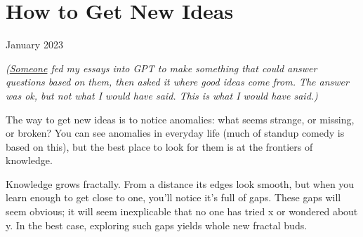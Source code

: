 \chapter{How to Get New Ideas}

January 2023

\emph{(\href{https://twitter.com/stef/status/1617222428727586816}{Someone}
fed my essays into GPT to make something that could answer questions
based on them, then asked it where good ideas come from. The answer was
ok, but not what I would have said. This is what I would have said.)}

The way to get new ideas is to notice anomalies: what seems strange, or
missing, or broken? You can see anomalies in everyday life (much of
standup comedy is based on this), but the best place to look for them is
at the frontiers of knowledge.

Knowledge grows fractally. From a distance its edges look smooth, but
when you learn enough to get close to one, you'll notice it's full of
gaps. These gaps will seem obvious; it will seem inexplicable that no
one has tried x or wondered about y. In the best case, exploring such
gaps yields whole new fractal buds.